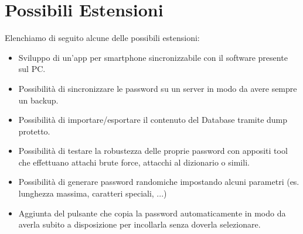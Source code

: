 \chapter{Possibili Estensioni}
Elenchiamo di seguito alcune delle possibili estensioni:
\begin{itemize}
	\item Sviluppo di un'app per smartphone sincronizzabile con il software presente sul PC.
	\item Possibilità di sincronizzare le password su un server in modo da avere sempre un backup.
	\item Possibilità di importare/esportare il contenuto del Database tramite dump protetto.
	\item Possibilità di testare la robustezza delle proprie password con appositi tool che effettuano attachi brute force, attacchi al dizionario o simili.
	\item Possibilità di generare password randomiche impostando alcuni parametri (es. lunghezza massima, caratteri speciali, ...)
	\item Aggiunta del pulsante che copia la password automaticamente in modo da averla subito a disposizione per incollarla senza doverla selezionare.
\end{itemize}